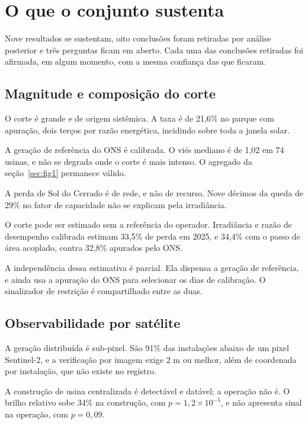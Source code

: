 \chapter{O que o conjunto sustenta}
\label{cap:estabelece}

Nove resultados se sustentam, oito conclusões foram retiradas por análise
posterior e três perguntas ficam em aberto. Cada uma das conclusões retiradas
foi afirmada, em algum momento, com a mesma confiança das que ficaram.

\section{Magnitude e composição do corte}

O corte é grande e de origem sistêmica. A taxa é de 21,6\% no parque com
apuração, dois terços por razão energética, incidindo sobre toda a janela solar.

A geração de referência do ONS é calibrada. O viés mediano é de 1,02 em 74
usinas, e não se degrada onde o corte é mais intenso. O agregado da
seção~\ref{sec:fig1} permanece válido.

A perda de Sol do Cerrado é de rede, e não de recurso. Nove décimos da queda de
29\% no fator de capacidade não se explicam pela irradiância.

O corte pode ser estimado sem a referência do operador. Irradiância e razão de
desempenho calibrada estimam 33,5\% de perda em 2025, e 34,4\% com o passo de
área acoplado, contra 32,8\% apurados pelo ONS.

\begin{objecao}
A independência dessa estimativa é parcial. Ela dispensa a geração de
referência, e ainda usa a apuração do ONS para selecionar os dias de calibração.
O sinalizador de restrição é compartilhado entre as duas.
\end{objecao}

\section{Observabilidade por satélite}

A geração distribuída é sub-pixel. São 91\% das instalações abaixo de um pixel
Sentinel-2, e a verificação por imagem exige 2 m ou melhor, além de coordenada
por instalação, que não existe no registro.

A construção de usina centralizada é detectável e datável; a operação não é. O
brilho relativo sobe 34\% na construção, com $p = 1{,}2 \times 10^{-5}$, e não
apresenta sinal na operação, com $p = 0{,}09$.

